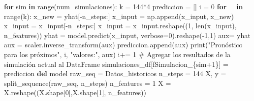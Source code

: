 \documentclass[
  us-letterpaper,
]{scrreprt}
\newenvironment{Shaded}{\begin{snugshade}}{\end{snugshade}}
\newcommand{\BuiltInTok}[1]{\textcolor[rgb]{0.00,0.23,0.31}{#1}}
\newcommand{\CommentTok}[1]{\textcolor[rgb]{0.37,0.37,0.37}{#1}}
\newcommand{\ControlFlowTok}[1]{\textcolor[rgb]{0.00,0.23,0.31}{\textbf{#1}}}
\newcommand{\DecValTok}[1]{\textcolor[rgb]{0.68,0.00,0.00}{#1}}
\newcommand{\KeywordTok}[1]{\textcolor[rgb]{0.00,0.23,0.31}{\textbf{#1}}}
\newcommand{\NormalTok}[1]{\textcolor[rgb]{0.00,0.23,0.31}{#1}}
\newcommand{\OperatorTok}[1]{\textcolor[rgb]{0.37,0.37,0.37}{#1}}
\newcommand{\SpecialCharTok}[1]{\textcolor[rgb]{0.37,0.37,0.37}{#1}}
\newcommand{\SpecialStringTok}[1]{\textcolor[rgb]{0.13,0.47,0.30}{#1}}
\newcommand{\StringTok}[1]{\textcolor[rgb]{0.13,0.47,0.30}{#1}}
\theoremstyle{plain}
\theoremstyle{definition}
\theoremstyle{definition}
\theoremstyle{remark}
\begin{document}
\begin{Shaded}
\begin{Highlighting}[]
\ControlFlowTok{for}\NormalTok{ sim }\KeywordTok{in} \BuiltInTok{range}\NormalTok{(num\_simulaciones):}
\NormalTok{    k }\OperatorTok{=} \DecValTok{144}\OperatorTok{*}\DecValTok{4}
\NormalTok{    prediccion }\OperatorTok{=}\NormalTok{ []}
\NormalTok{    i }\OperatorTok{=} \DecValTok{0}
    \ControlFlowTok{for}\NormalTok{ \_ }\KeywordTok{in} \BuiltInTok{range}\NormalTok{(k):}
\NormalTok{        x\_new }\OperatorTok{=}\NormalTok{ yhat[}\OperatorTok{{-}}\NormalTok{n\_steps:]}
\NormalTok{        x\_input }\OperatorTok{=}\NormalTok{ np.append(x\_input, x\_new)}
\NormalTok{        x\_input }\OperatorTok{=}\NormalTok{ x\_input[}\OperatorTok{{-}}\NormalTok{n\_steps:]}
\NormalTok{        x\_input }\OperatorTok{=}\NormalTok{ x\_input.reshape((}\DecValTok{1}\NormalTok{, }\BuiltInTok{len}\NormalTok{(x\_input), n\_features))}
\NormalTok{        yhat }\OperatorTok{=}\NormalTok{ model.predict(x\_input, verbose}\OperatorTok{=}\DecValTok{0}\NormalTok{).reshape(}\OperatorTok{{-}}\DecValTok{1}\NormalTok{,}\DecValTok{1}\NormalTok{)}
\NormalTok{        aux}\OperatorTok{=}\NormalTok{ yhat}
\NormalTok{        aux }\OperatorTok{=}\NormalTok{ scaler.inverse\_transform(aux)}
\NormalTok{        prediccion.append(aux)}
        \BuiltInTok{print}\NormalTok{(}\StringTok{"Pronóstico para los próximos"}\NormalTok{, i, }\StringTok{"valores:"}\NormalTok{, aux)}
\NormalTok{        i}\OperatorTok{+=} \DecValTok{1}
    \CommentTok{\# Agregar los resultados de la simulación actual al DataFrame}
\NormalTok{    simulaciones\_df[}\SpecialStringTok{f\textquotesingle{}Simulacion\_}\SpecialCharTok{\{}\NormalTok{sim}\OperatorTok{+}\DecValTok{1}\SpecialCharTok{\}}\SpecialStringTok{\textquotesingle{}}\NormalTok{] }\OperatorTok{=}\NormalTok{ prediccion}
    \KeywordTok{del}\NormalTok{ model}
\NormalTok{    raw\_seq }\OperatorTok{=}\NormalTok{ Datos\_historicos}
\NormalTok{    n\_steps }\OperatorTok{=} \DecValTok{144}
\NormalTok{    X, y }\OperatorTok{=}\NormalTok{ split\_sequence(raw\_seq, n\_steps)}
\NormalTok{    n\_features }\OperatorTok{=} \DecValTok{1}
\NormalTok{    X }\OperatorTok{=}\NormalTok{ X.reshape((X.shape[}\DecValTok{0}\NormalTok{],X.shape[}\DecValTok{1}\NormalTok{], n\_features))}


\end{Highlighting}
\end{Shaded}
\end{document}
